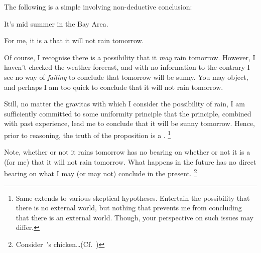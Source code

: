\begin{note}
  The following is a simple \illu{} involving non-deductive conclusion:
  \begin{illustration}
    It's mid summer in the Bay Area.
  \end{illustration}
  For me, it is a \fc{} that it will not rain tomorrow.

  Of course, I recognise there is a possibility that it \emph{may} rain tomorrow.
  However, I haven't checked the weather forecast, and with no information to the contrary I see no way of \emph{failing} to conclude that tomorrow will be sunny.
  You may object, and perhaps I am too quick to conclude that it will not rain tomorrow.

  Still, no matter the gravitas with which I consider the possibility of rain, I am sufficiently committed to some uniformity principle that the principle, combined with past experience, lead me to conclude that it will be sunny tomorrow.
  Hence, prior to reasoning, the truth of the proposition is a \fc{}.%
  \footnote{
    Same extends to various skeptical hypotheses.
    Entertain the possibility that there is no external world, but nothing that prevents me from concluding that there is an external world.
    Though, your perspective on such issues may differ.
  }

  Note, whether or not it rains tomorrow has no bearing on whether or not it is a \fc{} (for me) that it will not rain tomorrow.
  What happens in the future has no direct bearing on what I may (or may not) conclude in the present.%
  \footnote{
    Consider~\citeauthor{Russell:1912th}'s chicken\dots (Cf.~\citeyear[63]{Russell:1912th})
  }
\end{note}


